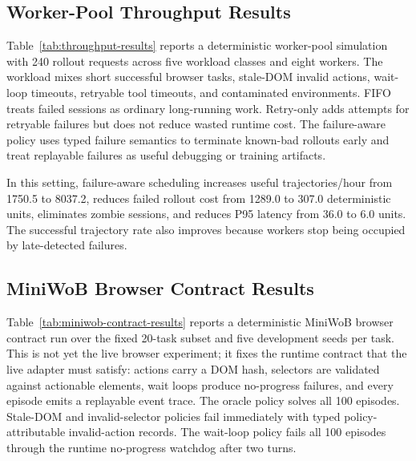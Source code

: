 \documentclass{article}
\begin{document}
\begin{table}[t]
\centering
\scriptsize
\resizebox{\linewidth}{!}{%

}
\caption{Worker-pool throughput simulation parameterized by the measured
Qwen3-4B model-to-action summaries in Table~\ref{tab:model-action-results}.}
\label{tab:model-action-throughput-results}
\end{table}

\subsection{Worker-Pool Throughput Results}

Table~\ref{tab:throughput-results} reports a deterministic worker-pool
simulation with 240 rollout requests across five workload classes and eight
workers. The workload mixes short successful browser tasks, stale-DOM invalid
actions, wait-loop timeouts, retryable tool timeouts, and contaminated
environments. FIFO treats failed sessions as ordinary long-running work.
Retry-only adds attempts for retryable failures but does not reduce wasted
runtime cost. The failure-aware policy uses typed failure semantics to terminate
known-bad rollouts early and treat replayable failures as useful debugging or
training artifacts.

In this setting, failure-aware scheduling increases useful trajectories/hour
from 1750.5 to 8037.2, reduces failed rollout cost from 1289.0 to 307.0
deterministic units, eliminates zombie sessions, and reduces P95 latency from
36.0 to 6.0 units. The successful trajectory rate also improves because workers
stop being occupied by late-detected failures.

\begin{table}[t]
\centering
\scriptsize
\resizebox{\linewidth}{!}{%

}
\caption{Deterministic worker-pool throughput simulation. Useful trajectories
include successful rollouts and replayable typed failures.}
\label{tab:throughput-results}
\end{table}

\subsection{MiniWoB Browser Contract Results}

Table~\ref{tab:miniwob-contract-results} reports a deterministic MiniWoB browser
contract run over the fixed 20-task subset and five development seeds per task.
This is not yet the live browser experiment; it fixes the runtime contract that
the live adapter must satisfy: actions carry a DOM hash, selectors are validated
against actionable elements, wait loops produce no-progress failures, and every
episode emits a replayable event trace. The oracle policy solves all 100
episodes. Stale-DOM and invalid-selector policies fail immediately with typed
policy-attributable invalid-action records. The wait-loop policy fails all 100
episodes through the runtime no-progress watchdog after two turns.
\end{document}
